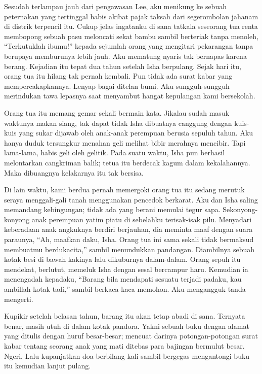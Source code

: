 \documentclass[smalldemyvopaper,11pt,twoside,onecolumn,openright,extrafontsizes]{memoir}
\begin{document}

Sesudah terlampau jauh dari pengawasan Lee, aku menikung ke sebuah peternakan yang tertinggal habis akibat pajak taksah dari segerombolan jahanam di distrik terpencil itu. Cukup jelas ingatanku di sana tatkala seseorang tua renta membopong sebuah pasu meloncati sekat bambu sambil berteriak tanpa menoleh, ``Terkutuklah ibumu!'' kepada sejumlah orang yang mengitari pekarangan tanpa berupaya memburunya lebih jauh. Aku mematung nyaris tak bernapas karena berang. Kejadian itu tepat dua tahun setelah Isha berpulang. Sejak hari itu, orang tua itu hilang tak pernah kembali. Pun tidak ada surat kabar yang  mempercakapkannya. Lenyap bagai ditelan bumi. Aku sungguh-sungguh merindukan tawa lepasnya saat menyambut hangat kepulangan kami bersekolah.

Orang tua itu memang gemar sekali bermain kata. Jikalau sudah masuk waktunya makan siang, tak dapat tidak Isha dibuatnya canggung dengan kuis-kuis yang sukar dijawab oleh anak-anak perempuan berusia sepuluh tahun. Aku hanya duduk tersungkur menahan geli melihat bibir merahnya mencibir. Tapi lama-lama, habis geli oleh gelitik. Pada suatu waktu, Isha pun berhasil melontarkan cangkriman balik; tetua itu berdecak kagum dalam kekalahannya. Maka dibuangnya kelakarnya itu tak bersisa.


Di lain waktu, kami berdua pernah memergoki orang tua itu sedang merutuk seraya menggali-gali tanah menggunakan pencedok berkarat. Aku dan Isha saling memandang kebingungan; tidak ada yang berani memulai tegur sapa. Sekonyong-konyong anak perempuan yatim piatu di sebelahku terisak-isak pilu. Menyadari keberadaan anak angkuknya berdiri berjauhan, dia meminta maaf dengan suara paraunya, ``Ah, maafkan daku, Isha. Orang tua ini sama sekali tidak bermaksud membuatmu berdukacita,'' sambil menundukkan pandangan. Diambilnya sebuah kotak besi di bawah kakinya lalu dikuburnya dalam-dalam. Orang sepuh itu mendekat, berlutut, memeluk Isha dengan sesal bercampur haru. Kemudian ia menengadah kepadaku, ``Barang bila mendapati sesuatu terjadi padaku, kau ambillah kotak tadi,'' sambil berkaca-kaca memohon. Aku mengangguk tanda mengerti.

Kupikir setelah belasan tahun, barang itu akan tetap abadi di sana. Ternyata benar, masih utuh di dalam kotak pandora. Yakni sebuah buku dengan alamat yang ditulis dengan huruf besar-besar; mencuat darinya potongan-potongan surat kabar tentang seorang anak yang mati ditebas para bajingan bermulut besar. Ngeri. Lalu kupanjatkan doa berbilang kali sambil bergegas mengantongi buku itu kemudian lanjut pulang.
\end{document}
